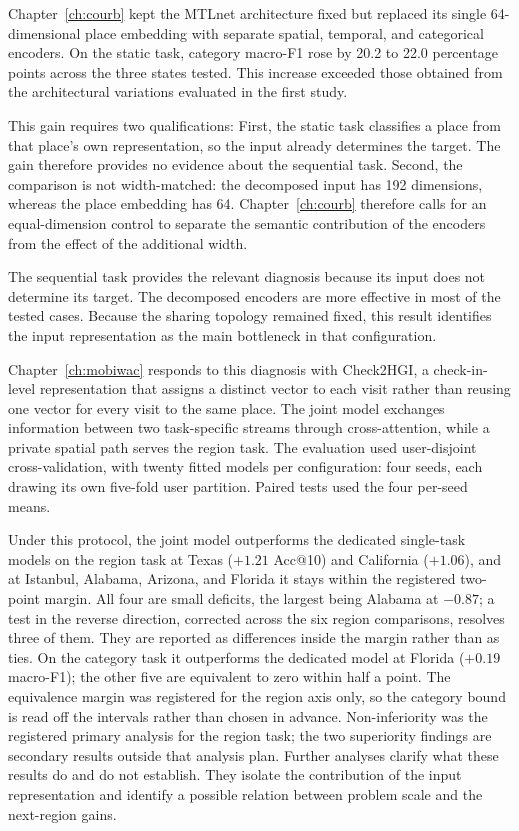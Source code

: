 Chapter~\ref{ch:courb} kept the MTLnet architecture fixed but replaced its single
64-dimensional place embedding with separate spatial, temporal, and categorical
encoders. On the static task, category macro-F1 rose by 20.2 to 22.0 percentage points
across the three states tested. This increase exceeded those obtained from the
architectural variations evaluated in the first study.

This gain requires two qualifications: First, the static task classifies a place from
that place's own representation, so the input already determines the target. The gain
therefore provides no evidence about the sequential task. Second, the comparison is not
width-matched: the decomposed input has 192 dimensions, whereas the place embedding has
64. Chapter~\ref{ch:courb} therefore calls for an equal-dimension control to separate the
semantic contribution of the encoders from the effect of the additional width.

The sequential task provides the relevant diagnosis because its input does not
determine its target. The decomposed encoders are more effective in most of the tested
cases. Because the sharing topology remained fixed, this result identifies the input
representation as the main bottleneck in that configuration.

Chapter~\ref{ch:mobiwac} responds to this diagnosis with Check2HGI, a check-in-level
representation that assigns a distinct vector to each visit rather than reusing one
vector for every visit to the same place. The joint model exchanges information between
two task-specific streams through cross-attention, while a private spatial path serves
the region task. The evaluation used user-disjoint cross-validation, with twenty fitted
models per configuration: four seeds, each drawing its own five-fold user partition.
Paired tests used the four per-seed means.

Under this protocol, the joint model outperforms the dedicated single-task models on the
region task at Texas ($+1.21$ Acc@10) and California ($+1.06$), and at Istanbul, Alabama,
Arizona, and Florida it stays within the registered two-point margin. All four are small
deficits, the largest being Alabama at $-0.87$; a test in the reverse direction, corrected across
the six region comparisons, resolves three of them. They are reported as differences inside the
margin rather than as ties. On
the category task it outperforms the dedicated model at Florida ($+0.19$ macro-F1); the
other five are equivalent to zero within half a point. The equivalence margin was registered for
the region axis only, so the category bound is read off the intervals rather than chosen in advance.
Non-inferiority was the registered primary analysis for the region task; the
two superiority findings are secondary results outside that analysis plan. Further analyses
clarify what these results do and do not establish. They isolate the contribution of the
input representation and identify a possible relation between problem scale and the next-region
gains.

